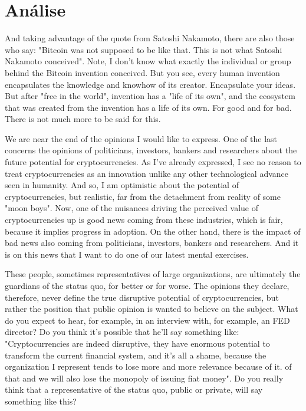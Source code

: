 \chapter{Análise}
And taking advantage of the quote from Satoshi Nakamoto, there are also those who say: "Bitcoin was not supposed to be like that. This is not what Satoshi Nakamoto conceived". Note, I don't know what exactly the individual or group behind the Bitcoin invention conceived. But you see, every human invention encapsulates the knowledge and knowhow of its creator. Encapsulate your ideas. But after "free in the world", invention has a "life of its own", and the ecosystem that was created from the invention has a life of its own. For good and for bad. There is not much more to be said for this.

We are near the end of the opinions I would like to express. One of the last concerns the opinions of politicians, investors, bankers and researchers about the future potential for cryptocurrencies. As I've already expressed, I see no reason to treat cryptocurrencies as an innovation unlike any other technological advance seen in humanity. And so, I am optimistic about the potential of cryptocurrencies, but realistic, far from the detachment from reality of some "moon boys". Now, one of the nuisances driving the perceived value of cryptocurrencies up is good news coming from these industries, which is fair, because it implies progress in adoption. On the other hand, there is the impact of bad news also coming from politicians, investors, bankers and researchers. And it is on this news that I want to do one of our latest mental exercises.

These people, sometimes representatives of large organizations, are ultimately the guardians of the status quo, for better or for worse. The opinions they declare, therefore, never define the true disruptive potential of cryptocurrencies, but rather the position that public opinion is wanted to believe on the subject. What do you expect to hear, for example, in an interview with, for example, an FED director? Do you think it's possible that he'll say something like: "Cryptocurrencies are indeed disruptive, they have enormous potential to transform the current financial system, and it's all a shame, because the organization I represent tends to lose more and more relevance because of it. of that and we will also lose the monopoly of issuing fiat money". Do you really think that a representative of the status quo, public or private, will say something like this?

